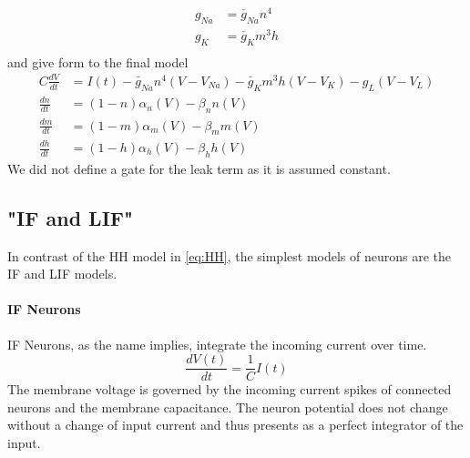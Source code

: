 \begin{equation}
	\begin{aligned}
	g_{Na} &= \bar{g}_{Na} n^4\\
	g_{K} &= \bar{g}_{K} m^3h\\
	\end{aligned}
\end{equation}
and give form to the final model
\begin{equation}\label{eq:HH}
	\begin{aligned}
	C\frac{dV}{dt} &= I(t) -\bar{g}_{Na} n^4(V-V_{Na}) - \bar{g}_{K} m^3h(V-V_{K}) -g_L(V-V_{L})\\
	\frac{dn}{dt} &= (1-n)\alpha_n(V) - \beta_n n (V)\\
	\frac{dm}{dt} &= (1-m)\alpha_m(V) - \beta_m m (V)\\
	\frac{dh}{dt} &= (1-h)\alpha_h(V) - \beta_h h (V)
	\end{aligned}
\end{equation}
We did not define a gate for the leak term as it is assumed constant.
\subsection{"IF and LIF"}
In contrast of the \ac{HH} model in \cref{eq:HH}, the simplest models of neurons are the \ac{IF} and \ac{LIF} models.\\
\paragraph{IF Neurons}
\ac{IF} Neurons, as the name implies, integrate the incoming current over time.
\begin{equation}
	\frac{d V(t)}{d t} = \frac{1}{C}I(t)
\end{equation}
The membrane voltage is governed by the incoming current spikes of connected neurons and the membrane capacitance. The neuron potential does not change without a change of input current and thus presents as a perfect integrator of the input.\\
